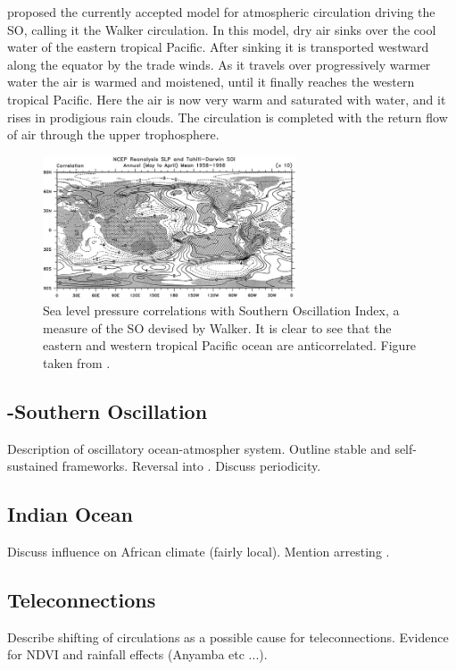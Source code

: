 \cite{bjerknes1969} proposed the currently accepted model for atmospheric
circulation driving the SO, calling it the Walker circulation. In this model,
dry air sinks over the cool water of the eastern tropical Pacific. After sinking
it is transported westward along the equator by the trade winds. As it travels
over progressively warmer water the air is warmed and moistened, until it
finally reaches the western tropical Pacific. Here the air is now very warm and
saturated with water, and it rises in prodigious rain clouds. The circulation is
completed with the return flow of air through the upper trophosphere.

\begin{figure}
  \centering
  \label{fig:slp_corr}
  \includegraphics[width=0.67\textwidth]{figures/slp_corr}
  \caption{Sea level pressure correlations with Southern Oscillation Index, a
    measure of the SO devised by Walker. It is clear to see that the eastern and
    western tropical Pacific ocean are anticorrelated. Figure taken from
    \cite{trenberth2000}.}
\end{figure}

\subsection{\elnino-Southern Oscillation}
Description of oscillatory ocean-atmospher system. Outline stable and
self-sustained frameworks. Reversal into \nina. Discuss periodicity.

\subsection{Indian Ocean}
Discuss influence on African climate (fairly local). Mention arresting .

\subsection{Teleconnections}
Describe shifting of circulations as a possible cause for
teleconnections. Evidence for NDVI and rainfall effects (Anyamba etc ...).
